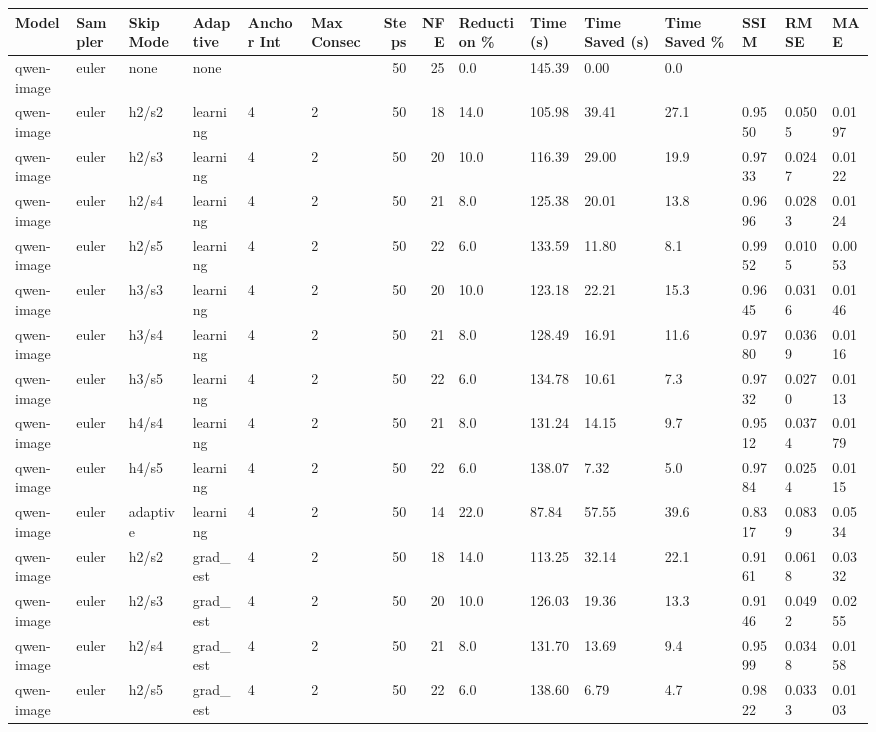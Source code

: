 \begin{tabular}{llllllrrlllllll}
\toprule
Model & Sampler & Skip Mode & Adaptive & Anchor Int & Max Consec & Steps & NFE & Reduction \% & Time (s) & Time Saved (s) & Time Saved \% & SSIM & RMSE & MAE \\
\midrule
qwen-image & euler & none & none &  &  & 50 & 25 & 0.0 & 145.39 & 0.00 & 0.0 &  &  &  \\
qwen-image & euler & h2/s2 & learning & 4 & 2 & 50 & 18 & 14.0 & 105.98 & 39.41 & 27.1 & 0.9550 & 0.0505 & 0.0197 \\
qwen-image & euler & h2/s3 & learning & 4 & 2 & 50 & 20 & 10.0 & 116.39 & 29.00 & 19.9 & 0.9733 & 0.0247 & 0.0122 \\
qwen-image & euler & h2/s4 & learning & 4 & 2 & 50 & 21 & 8.0 & 125.38 & 20.01 & 13.8 & 0.9696 & 0.0283 & 0.0124 \\
qwen-image & euler & h2/s5 & learning & 4 & 2 & 50 & 22 & 6.0 & 133.59 & 11.80 & 8.1 & 0.9952 & 0.0105 & 0.0053 \\
qwen-image & euler & h3/s3 & learning & 4 & 2 & 50 & 20 & 10.0 & 123.18 & 22.21 & 15.3 & 0.9645 & 0.0316 & 0.0146 \\
qwen-image & euler & h3/s4 & learning & 4 & 2 & 50 & 21 & 8.0 & 128.49 & 16.91 & 11.6 & 0.9780 & 0.0369 & 0.0116 \\
qwen-image & euler & h3/s5 & learning & 4 & 2 & 50 & 22 & 6.0 & 134.78 & 10.61 & 7.3 & 0.9732 & 0.0270 & 0.0113 \\
qwen-image & euler & h4/s4 & learning & 4 & 2 & 50 & 21 & 8.0 & 131.24 & 14.15 & 9.7 & 0.9512 & 0.0374 & 0.0179 \\
qwen-image & euler & h4/s5 & learning & 4 & 2 & 50 & 22 & 6.0 & 138.07 & 7.32 & 5.0 & 0.9784 & 0.0254 & 0.0115 \\
qwen-image & euler & adaptive & learning & 4 & 2 & 50 & 14 & 22.0 & 87.84 & 57.55 & 39.6 & 0.8317 & 0.0839 & 0.0534 \\
qwen-image & euler & h2/s2 & grad_est & 4 & 2 & 50 & 18 & 14.0 & 113.25 & 32.14 & 22.1 & 0.9161 & 0.0618 & 0.0332 \\
qwen-image & euler & h2/s3 & grad_est & 4 & 2 & 50 & 20 & 10.0 & 126.03 & 19.36 & 13.3 & 0.9146 & 0.0492 & 0.0255 \\
qwen-image & euler & h2/s4 & grad_est & 4 & 2 & 50 & 21 & 8.0 & 131.70 & 13.69 & 9.4 & 0.9599 & 0.0348 & 0.0158 \\
qwen-image & euler & h2/s5 & grad_est & 4 & 2 & 50 & 22 & 6.0 & 138.60 & 6.79 & 4.7 & 0.9822 & 0.0333 & 0.0103 \\

\end{tabular}
